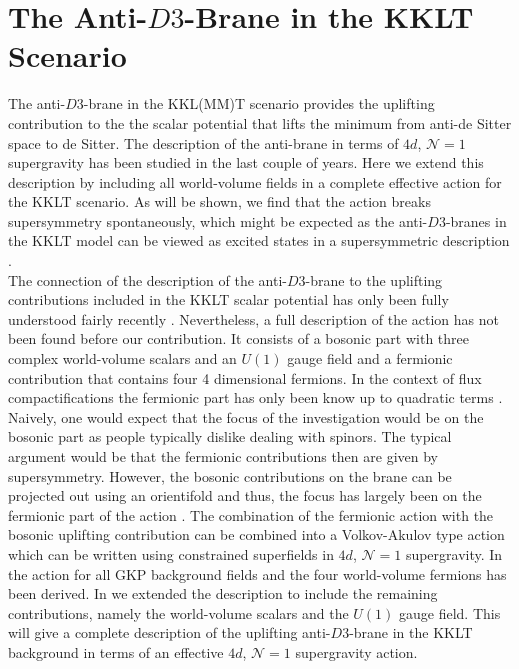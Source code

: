 \documentclass[12pt]{report}
\begin{document}
\section{The Anti-$D3$-Brane in the KKLT Scenario}
\label{sec:D3barKKLTmain}
The anti-$D3$-brane in the KKL(MM)T scenario \cite{Kachru:2003aw,Kachru:2003sx} provides the uplifting contribution to the the scalar potential that lifts the minimum from anti-de Sitter space to de Sitter. The description of the anti-brane in terms of $4d$, $\mathcal{N}=1$ supergravity has been studied in the last couple of years. Here we extend this description by including all world-volume fields in a complete effective action for the KKLT scenario. As will be shown, we find that the action breaks supersymmetry spontaneously, which might be expected as the anti-$D3$-branes in the KKLT model can be viewed as excited states in a supersymmetric description \cite{Kachru:2002gs}.\\
The connection of the description of the anti-$D3$-brane to the uplifting contributions included in the KKLT scalar potential has only been fully understood fairly recently \cite{Ferrara:2014kva,Kallosh:2014wsa,Bergshoeff:2015jxa,Kallosh:2015nia,Garcia-Etxebarria:2015lif}. Nevertheless, a full description of the action has not been found before our contribution. It consists of a bosonic part with three complex world-volume scalars and an $U(1)$ gauge field and a fermionic contribution that contains four 4 dimensional fermions. In the context of flux compactifications the fermionic part has only been know up to quadratic terms \cite{Grana:2002tu,Grana:2003ek,Marolf:2003ye,Tripathy:2005hv,Martucci:2005rb,Bergshoeff:2013pia}. Naively, one would expect that the focus of the investigation would be on the bosonic part as people typically dislike dealing with spinors. The typical argument would be that the fermionic contributions then are given by supersymmetry. However, the bosonic contributions on the brane can be projected  out using an orientifold and thus, the focus has largely been on the fermionic part of the action \cite{Kallosh:2014wsa,Bergshoeff:2015jxa,Kallosh:2015nia,Garcia-Etxebarria:2015lif,Dasgupta:2016prs,GarciadelMoral:2017vnz}. The combination of the fermionic action with the bosonic uplifting contribution can be combined into a Volkov-Akulov type action \cite{Volkov:1973ix} which can be written using constrained superfields in $4d$, $\mathcal{N}=1$ supergravity. In \cite{GarciadelMoral:2017vnz} the action for all GKP background fields and the four world-volume fermions has been derived. In \cite{Cribiori:2019hod} we extended the description to include the remaining contributions, namely the world-volume scalars and the $U(1)$ gauge field. This will give a complete description of the uplifting anti-$D3$-brane in the KKLT background in terms of an effective $4d$, $\mathcal{N}=1$ supergravity action.
\end{document}
